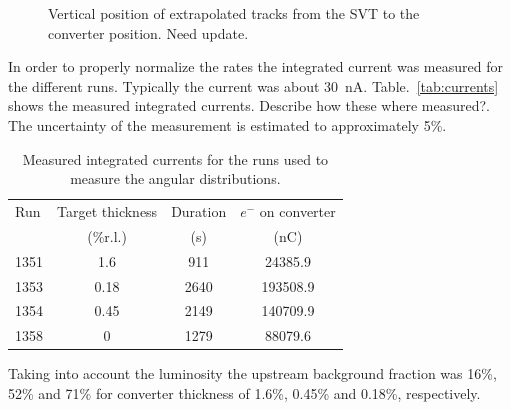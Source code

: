 \begin{figure}[t]
\caption{\small{Vertical position of extrapolated tracks from the SVT to the converter position.} {\color{red}Need update.}}\label{fig:tracks_at_converter}
\end{figure}

In order to properly normalize the rates the integrated current was measured for the different 
runs. Typically the current was about 30~nA. Table.~\ref{tab:currents} shows the measured integrated currents. {\color{red} Describe how these where measured?}. The uncertainty 
of the measurement is estimated to approximately 5\%. 
\begin{table}
\centering
\begin{tabular}{l|c|c|c}
Run & Target thickness & Duration &  $e^-$ on converter \\
 &  (\%r.l.) & (s) & (nC)    \\   
\hline\hline
1351 & 1.6   & 911 &     24385.9     \\
\hline
1353 & 0.18   & 2640 &    193508.9  \\
\hline
1354 & 0.45  & 2149 &       140709.9  \\
\hline
1358 & 0    & 1279  &   88079.6  \\
\hline
\end{tabular}
\caption{{\small Measured integrated currents for the runs used to measure the angular distributions.}}
\end{table}
Taking into account the luminosity the upstream background fraction was 16\%, 52\% and 71\% 
for converter thickness of 1.6\%, 0.45\% and 0.18\%, respectively. 

